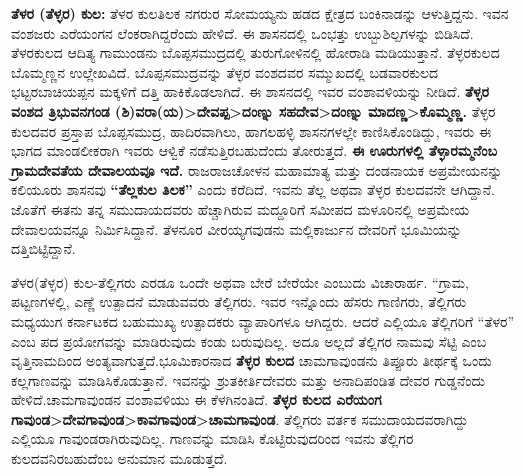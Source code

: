 \textbf{ತೆಳರ (ತೆಳ್ಳರ) ಕುಲ:} ತೆಳರ ಕುಲತಿಲಕ ನಗರುರ ಸೋಮಯ್ಯನು ಹಡದ ಕ್ಷೇತ್ರದ ಬಂಕಿನಾಡನ್ನು ಆಳುತ್ತಿದ್ದನು. ಇವನ ವಂಶಜರು ಎರೆಯಂಗನ ಲೆಂಕರಾಗಿದ್ದರೆಂದು ಹೇಳಿದೆ. ಈ ಶಾಸನದಲ್ಲಿ ಒಂಭತ್ತು ಉಬ್ಬುಶಿಲ್ಪಗಳನ್ನು ಬಿಡಿಸಿದೆ. ತೆಳರಕುಲದ ಆದಿತ್ಯ ಗಾಮುಂಡನು ಬೊಪ್ಪಸಮುದ್ರದಲ್ಲಿ ತುರುಗೋಳಿನಲ್ಲಿ ಹೋರಾಡಿ ಮಡಿಯುತ್ತಾನೆ. ತೆಳ್ಳರಕುಲದ ಬೊಮ್ಮಣ್ಣನ ಉಲ್ಲೇಖವಿದೆ. ಬೊಪ್ಪಸಮುದ್ರವನ್ನು ತೆಳ್ಳರ ವಂಶದವರ ಸಮ್ಮುಖದಲ್ಲಿ ಬಡವಾರಕುಲದ ಭಟ್ಟರಬಾಚಿಯಪ್ಪನ ಮಕ್ಕಳಿಗೆ ದತ್ತಿ ಹಾಕಿಕೊಡಲಾಗಿದೆ. ಈ ಶಾಸನದಲ್ಲಿ ಇವರ ವಂಶಾವಳಿಯನ್ನು ನೀಡಿದೆ. \textbf{ತೆಳ್ಳರ ವಂಶದ ತ್ರಿಭುವನಗಂಡ (ಶಿ)ವರಾ(ಯ)\textgreater  ದೇವಪ್ಪ\textgreater  ದಂಣ್ನು ಸಹದೇವ\textgreater  ದಂಣ್ನು ಮಾದಣ್ಣ\textgreater  ಕೊಮ್ಮಣ್ಣ. } ತೆಳ್ಳರ ಕುಲದವರ ಪ್ರಸ್ತಾಪ ಬೊಪ್ಪಸಮುದ್ರ, ಹಾದಿರವಾಗಿಲು, ಹಾಗಲಹಳ್ಳಿ ಶಾಸನಗಳಲ್ಲೇ ಕಾಣಿಸಿಕೊಂಡಿದ್ದು, ಇವರು ಈ ಭಾಗದ ಮಾಂಡಲೀಕರಾಗಿ ಇವರು ಆಳ್ವಿಕೆ ನಡೆಸುತ್ತಿರಬಹುದೆಂದು ತೋರುತ್ತದೆ. \textbf{ಈ ಊರುಗಳಲ್ಲಿ ತೆಳ್ಳಾರಮ್ಮನೆಂಬ ಗ್ರಾಮದೇವತೆಯ ದೇವಾಲಯವೂ ಇದೆ.} ರಾಜರಾಜಚೋಳನ ಮಹಾಮಾತ್ಯ ಮತ್ತು ದಂಡನಾಯಕ ಅಪ್ರಮೇಯನನ್ನು ಕಲಿಯೂರು ಶಾಸನವು \textbf{“ತೆಲ್ಲಕುಲ ತಿಲಕ”} ಎಂದು ಕರೆದಿದೆ. ಇವನು ತೆಲ್ಲ ಅಥವಾ ತೆಳ್ಳರ ಕುಲದವನೇ ಆಗಿದ್ದಾನೆ. ಜೊತೆಗೆ ಈತನು ತನ್ನ ಸಮುದಾಯದವರು ಹೆಚ್ಚಾಗಿರುವ ಮದ್ದೂರಿಗೆ ಸಮೀಪದ ಮಳೂರಿನಲ್ಲಿ ಅಪ್ರಮೇಯ ದೇವಾಲಯವನ್ನೂ ನಿರ್ಮಿಸಿದ್ದಾನೆ. ತೆಳನೂರ ವೀರಯ್ಯಗವುಡನು ಮಲ್ಲಿಕಾರ್ಜುನ ದೇವರಿಗೆ ಭೂಮಿಯನ್ನು ದತ್ತಿಬಿಟ್ಟಿದ್ದಾನೆ.

\newpage

ತೆಳರ(ತೆಳ್ಳರ) ಕುಲ-ತೆಲ್ಲಿಗರು ಎರಡೂ ಒಂದೇ ಅಥವಾ ಬೇರೆ ಬೇರೆಯೇ ಎಂಬುದು ವಿಚಾರಾರ್ಹ. “ಗ್ರಾಮ, ಪಟ್ಟಣಗಳಲ್ಲಿ, ಎಣ್ಣೆ ಉತ್ಪಾದನೆ ಮಾಡುವವರು ತೆಲ್ಲಿಗರು. ಇವರ ಇನ್ನೊಂದು ಹೆಸರು ಗಾಣಿಗರು, ತೆಲ್ಲಿಗರು ಮಧ್ಯಯುಗ ಕರ್ನಾಟಕದ ಬಹುಮುಖ್ಯ ಉತ್ಪಾದಕರು ವ್ಯಾಪಾರಿಗಳೂ ಆಗಿದ್ದರು. ಆದರೆ ಎಲ್ಲಿಯೂ ತೆಲ್ಲಿಗರಿಗೆ “ತೆಳರ” ಎಂಬ ಪದ ಪ್ರಯೋಗವನ್ನು ಮಾಡಿರುವುದು ಕಂಡು ಬರುವುದಿಲ್ಲ. ಅದೂ ಅಲ್ಲದೆ ತೆಲ್ಲಿಗರ ನಾಮವು ಸೆಟ್ಟಿ ಎಂಬ ವೃತ್ತಿನಾಮದಿಂದ ಅಂತ್ಯವಾಗುತ್ತದೆ.ಭೂಮಿಕಾರನಾದ \textbf{ತೆಳ್ಳರ ಕುಲದ} ಚಾಮಗಾವುಂಡನು ತಿಪ್ಪೂರು ತೀರ್ಥಕ್ಕೆ ಒಂದು ಕಲ್ಲಗಾಣವನ್ನು ಮಾಡಿಸಿಕೊಡುತ್ತಾನೆ. ಇವನನ್ನು ಶ್ರುತಕೀರ್ತಿದೇವರು ಮತ್ತು ಅನಾದಿಪಂಡಿತ ದೇವರ ಗುಡ್ಡನೆಂದು ಹೇಳಿದೆ.\break ಚಾಮಗಾವುಂಡನ ವಂಶಾವಳಿಯು ಈ ಕೆಳಗಿನಂತಿದೆ. \textbf{ತೆಳ್ಳರ ಕುಲದ ಎರೆಯಂಗ ಗಾವುಂಡ\textgreater ದೇವಗಾವುಂಡ\textgreater ಕಾವಗಾವುಂಡ\textgreater \general{\break }ಚಾಮಗಾವುಂಡ}. ತೆಲ್ಲಿಗರು ವರ್ತಕ ಸಮುದಾಯದವರಾಗಿದ್ದು ಎಲ್ಲಿಯೂ ಗಾವುಂಡರಾಗಿರುವುದಿಲ್ಲ. ಗಾಣವನ್ನು ಮಾಡಿಸಿ ಕೊಟ್ಟಿರುವುದರಿಂದ ಇವನು ತೆಲ್ಲಿಗರ ಕುಲದವನಿರಬಹುದೆಂಬ ಅನುಮಾನ ಮೂಡುತ್ತದೆ.

